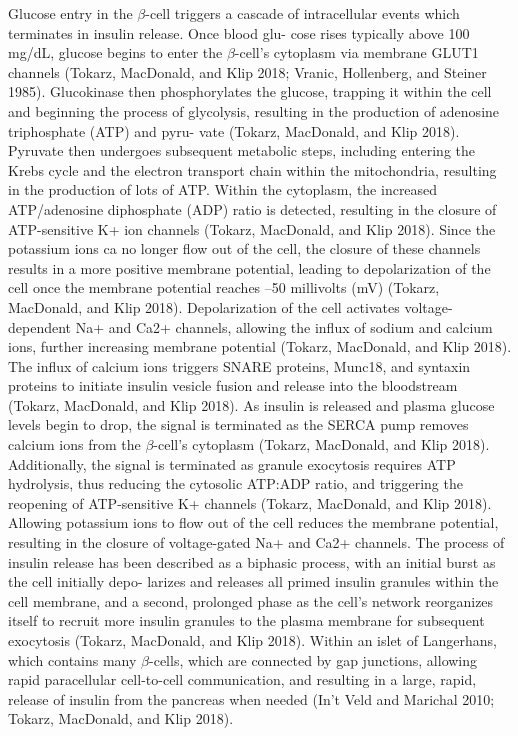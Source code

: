 \documentclass{article}
\begin{document}
Glucose entry in the $\beta$-cell triggers a cascade of intracellular events which terminates in insulin release. Once blood glu-
cose rises typically above 100 mg/dL, glucose begins to enter the $\beta$-cell’s cytoplasm via membrane GLUT1 channels (Tokarz,
MacDonald, and Klip 2018; Vranic, Hollenberg, and Steiner 1985). Glucokinase then phosphorylates the glucose, trapping it
within the cell and beginning the process of glycolysis, resulting in the production of adenosine triphosphate (ATP) and pyru-
vate (Tokarz, MacDonald, and Klip 2018). Pyruvate then undergoes subsequent metabolic steps, including entering the Krebs
cycle and the electron transport chain within the mitochondria, resulting in the production of lots of ATP. Within the cytoplasm,
the increased ATP/adenosine diphosphate (ADP) ratio is detected, resulting in the closure of ATP-sensitive K+ ion channels
(Tokarz, MacDonald, and Klip 2018). Since the potassium ions ca no longer flow out of the cell, the closure of these channels
results in a more positive membrane potential, leading to depolarization of the cell once the membrane potential reaches –50
millivolts (mV) (Tokarz, MacDonald, and Klip 2018). Depolarization of the cell activates voltage-dependent Na+ and Ca2+
channels, allowing the influx of sodium and calcium ions, further increasing membrane potential (Tokarz, MacDonald, and Klip
2018). The influx of calcium ions triggers SNARE proteins, Munc18, and syntaxin proteins to initiate insulin vesicle fusion and
release into the bloodstream (Tokarz, MacDonald, and Klip 2018). As insulin is released and plasma glucose levels begin to
drop, the signal is terminated as the SERCA pump removes calcium ions from the $\beta$-cell’s cytoplasm (Tokarz, MacDonald, and
Klip 2018). Additionally, the signal is terminated as granule exocytosis requires ATP hydrolysis, thus reducing the cytosolic
ATP:ADP ratio, and triggering the reopening of ATP-sensitive K+ channels (Tokarz, MacDonald, and Klip 2018). Allowing
potassium ions to flow out of the cell reduces the membrane potential, resulting in the closure of voltage-gated Na+ and Ca2+
channels. The process of insulin release has been described as a biphasic process, with an initial burst as the cell initially depo-
larizes and releases all primed insulin granules within the cell membrane, and a second, prolonged phase as the cell’s network
reorganizes itself to recruit more insulin granules to the plasma membrane for subsequent exocytosis (Tokarz, MacDonald,
and Klip 2018). Within an islet of Langerhans, which contains many $\beta$-cells, which are connected by gap junctions, allowing
rapid paracellular cell-to-cell communication, and resulting in a large, rapid, release of insulin from the pancreas when needed
(In’t Veld and Marichal 2010; Tokarz, MacDonald, and Klip 2018).
\end{document}
